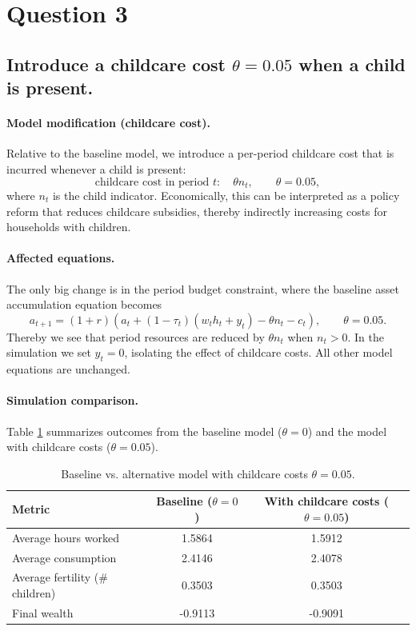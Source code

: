 \section{Question 3}

\subsection{Introduce a childcare cost $\theta=0.05$ when a child is present.}

\bigskip

\paragraph{Model modification (childcare cost).}
Relative to the baseline model, we introduce a per-period childcare cost that is incurred whenever a child is present:
\[
\text{childcare cost in period } t:\quad \theta n_t,\qquad \theta=0.05,
\]
where $n_t$ is the child indicator. Economically, this can be interpreted as a policy reform that reduces childcare subsidies, thereby indirectly increasing costs for households with children.

\paragraph{Affected equations.}
The only big change is in the period budget constraint, where the baseline asset accumulation equation becomes
\[
a_{t+1} = (1+r)(a_t + (1-\tau_t)(w_t h_t + y_t) - \theta n_t - c_t),
\qquad \theta = 0.05.
\]
Thereby we see that period resources are reduced by $\theta n_t$ when $n_t>0$. In the simulation we set $y_t = 0$, isolating the effect of childcare costs. All other model equations are unchanged.

\paragraph{Simulation comparison.}
Table \ref{tab:compare_baseline_childcare} summarizes outcomes from the baseline model ($\theta=0$) and the model with childcare costs ($\theta=0.05$).

\begin{table}[H]
\centering
\begin{tabular}{lcc}
\hline
Metric & Baseline ($\theta=0$) & With childcare costs ($\theta=0.05$) \\
\hline
Average hours worked & 1.5864 & 1.5912 \\
Average consumption  & 2.4146 & 2.4078 \\
Average fertility (\# children) & 0.3503 & 0.3503 \\
Final wealth &  -0.9113 & -0.9091 \\
\hline
\end{tabular}
\caption{Baseline vs. alternative model with childcare costs $\theta=0.05$.}
\label{tab:compare_baseline_childcare}
\end{table}

